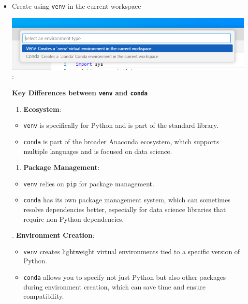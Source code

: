 \documentclass[
  letterpaper,
  DIV=11,
  numbers=noendperiod]{scrreprt}
\providecommand{\tightlist}{%
  \setlength{\itemsep}{0pt}\setlength{\parskip}{0pt}}\usepackage{longtable,booktabs,array}
\begin{document}
\begin{itemize}
\begin{figure}
  \end{figure}
\item
  Create using \texttt{venv} in the current workspace

  \includegraphics{images/env_create_option.png}:

  \textbf{Key Differences between \texttt{venv} and \texttt{conda}}

  \begin{enumerate}
  \def\labelenumi{\arabic{enumi}.}
  \tightlist
  \item
    \textbf{Ecosystem}:
  \end{enumerate}

  \begin{itemize}
  \tightlist
  \item
    \texttt{venv} is specifically for Python and is part of the standard
    library.
  \item
    \texttt{conda} is part of the broader Anaconda ecosystem, which
    supports multiple languages and is focused on data science.
  \end{itemize}

  \begin{enumerate}
  \def\labelenumi{\arabic{enumi}.}
  \setcounter{enumi}{1}
  \tightlist
  \item
    \textbf{Package Management}:
  \end{enumerate}

  \begin{itemize}
  \tightlist
  \item
    \texttt{venv} relies on \texttt{pip} for package management.
  \item
    \texttt{conda} has its own package management system, which can
    sometimes resolve dependencies better, especially for data science
    libraries that require non-Python dependencies.
  \end{itemize}

  . \textbf{Environment Creation}:

  \begin{itemize}
  \tightlist
  \item
    \texttt{venv} creates lightweight virtual environments tied to a
    specific version of Python.
  \item
    \texttt{conda} allows you to specify not just Python but also other
    packages during environment creation, which can save time and ensure
    compatibility.
  \end{itemize}


\end{itemize}
\end{document}
